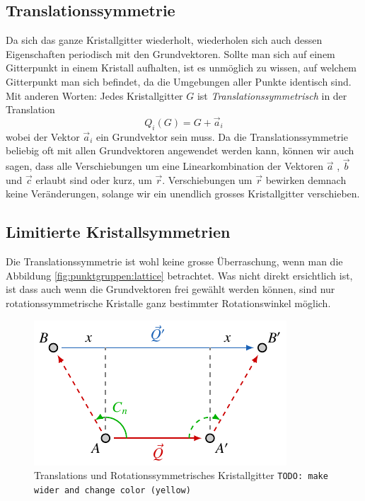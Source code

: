 \subsection{Translationssymmetrie}
Da sich das ganze Kristallgitter wiederholt, wiederholen sich auch dessen Eigenschaften periodisch mit den Grundvektoren.
Sollte man sich auf einem Gitterpunkt in einem Kristall aufhalten, ist es unmöglich zu wissen, auf welchem Gitterpunkt man sich befindet, 
da die Umgebungen aller Punkte identisch sind. 
Mit anderen Worten: Jedes Kristallgitter $ G $ ist \emph{Translationssymmetrisch} in der Translation 
\[
    Q_i(G) = G + \vec{a}_i
\] wobei der Vektor $\vec{a}_i$ ein Grundvektor sein muss.
Da die Translationssymmetrie beliebig oft mit allen Grundvektoren angewendet werden kann, 
können wir auch sagen, dass alle Verschiebungen um eine Linearkombination 
der Vektoren $\vec{a}$ , $\vec{b}$ und $\vec{c}$ erlaubt sind oder kurz, um $\vec{r}$. 
Verschiebungen um $\vec{r}$ bewirken demnach keine Veränderungen, 
solange wir ein unendlich grosses Kristallgitter verschieben.

\subsection{Limitierte Kristallsymmetrien}
 Die Translationssymmetrie ist wohl keine grosse Überraschung, wenn man die Abbildung \ref{fig:punktgruppen:lattice} betrachtet.
 Was nicht direkt ersichtlich ist, ist dass auch wenn die Grundvektoren frei gewählt werden können, 
 sind nur rotationssymmetrische Kristalle ganz bestimmter Rotationswinkel möglich.

\begin{figure}
    \centering
    \includegraphics[]{papers/punktgruppen/figures/combine-symmetries}
    \caption{
        Translations und Rotationssymmetrisches Kristallgitter
        \texttt{TODO: make wider and change color (yellow)}
    }
    \label{fig:punktgruppen:rot-geometry}
\end{figure}

